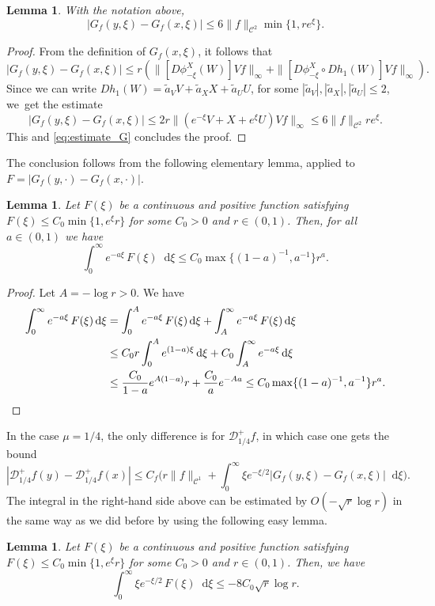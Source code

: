 \documentclass[11pt]{article}
\newcommand*{\diff}{\mathop{}\!\mathrm{d}}
\newtheorem {lemma}[theorem]{Lemma}
\theoremstyle{definition}
\begin{document}
\begin{lemma}
With the notation above,
\[
|G_{f}(y,\xi) -G_{f}(x,\xi) |\leq 6 \|f\|_{\mathscr{C}^2} \min\{1, r e^\xi\}.
\]
\end{lemma}
\begin{proof}
From the definition of $G_{f}(x,\xi)$, it follows that
\[
|G_{f}(y,\xi) -G_{f}(x,\xi) |\leq r (\|[D\phi^X_{-\xi}(W) ] Vf \|_\infty + \|[D\phi^X_{-\xi} \circ Dh_1 (W)] Vf \|_\infty).
\]
Since we can write $Dh_1 (W) = {\widetilde a_V}V+{\widetilde a_X}X+{\widetilde a_U}U$, for some $|{\widetilde a_V}|, |{\widetilde a_X}|, |{\widetilde a_U}|\leq 2$, we~get the estimate
\[
|G_{f}(y,\xi) -G_{f}(x,\xi) |\leq 2 r \|(e^{-\xi}V + X + e^{\xi}U)Vf\|_\infty \leq 6 \|f\|_{\mathscr{C}^2} r e^\xi.
\]
This and \eqref{eq:estimate_G} concludes the proof.
\end{proof}

The conclusion follows from the following elementary lemma, applied to $F=|G_{f}(y, \cdot) - G_{f}(x, \cdot)|$.

\begin{lemma}
Let $F(\xi)$ be a continuous and positive function satisfying $F(\xi) \leq C_0 \min\{ 1, e^\xi r\}$ for some $C_0>0$ and $r \in (0,1)$. Then, for all $a\in (0,1)$ we have
\[
\int_0^\infty e^{-a \xi} \, F(\xi) \diff \xi \leq C_0 \max\{(1-a)^{-1}, a^{-1}\} r^a.
\]
\end{lemma}
\begin{proof}
Let $A = -\log r >0$. We have
\begin{align*}
\int_0^\infty e^{-a \xi} \, F(\xi) \diff \xi &= \int_0^A e^{-a \xi} \, F(\xi) \diff \xi + \int_A^{\infty} e^{-a \xi} \, F(\xi) \diff \xi \\
& \leq C_0 r \int_0^A e^{(1-a) \xi} \diff \xi + C_0 \int_A^{\infty} e^{-a \xi} \diff \xi \\
&\leq \frac{C_0}{1-a}e^{A(1-a)} r + \frac{C_0}{a} e^{-Aa} \leq C_0 \max\{(1-a)^{-1}, a^{-1}\} r^a.\qedhere
\end{align*}
\end{proof}

In the case $\mu=1/4$, the only difference is for $\mathcal{D}^{+}_{1/4}f$, in which case one gets the bound
\[
|\mathcal{D}^{+}_{1/4}f(y) - \mathcal{D}^{+}_{1/4}f(x)|\leq C_{f} \biggl(r \|f\|_{\mathscr{C}^1} + \int_0^{\infty} \xi e^{- \xi/2} |G_{f}(y,\xi) -G_{f}(x,\xi) |\diff \xi \biggr).
\]
The integral in the right-hand side above can be estimated by $O(-\sqrt{r} \log r)$ in the same way as we did before by using the following easy lemma.
\begin{lemma}
Let $F(\xi)$ be a continuous and positive function satisfying $F(\xi) \leq C_0 \min\{ 1, e^\xi r\}$ for some $C_0>0$ and $r \in (0,1)$. Then, we have
\[
\int_0^\infty \xi e^{- \xi/2} \, F(\xi) \diff \xi \leq -8C_0 \sqrt{r} \log r.
\]
\end{lemma}
\end{document}

